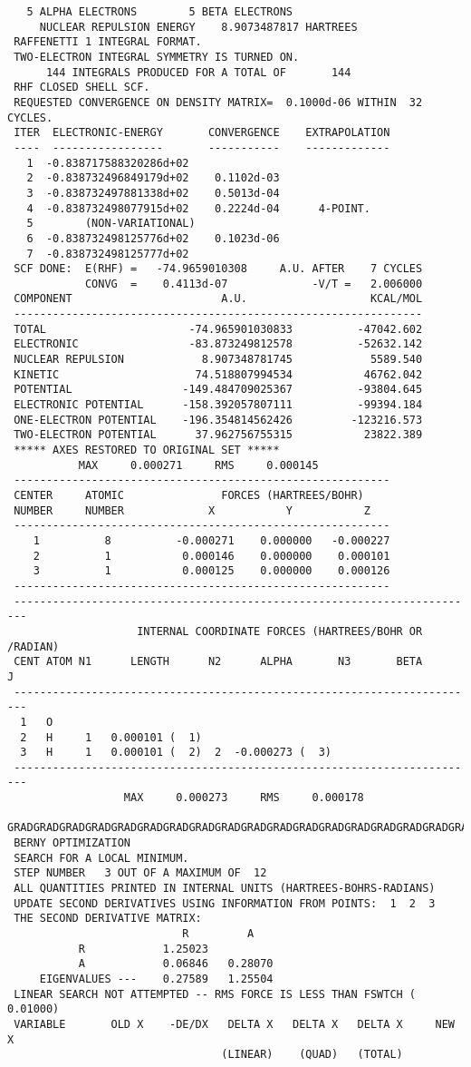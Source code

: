 {\begin{verbatim}
   5 ALPHA ELECTRONS        5 BETA ELECTRONS
     NUCLEAR REPULSION ENERGY    8.9073487817 HARTREES
 RAFFENETTI 1 INTEGRAL FORMAT.
 TWO-ELECTRON INTEGRAL SYMMETRY IS TURNED ON.
      144 INTEGRALS PRODUCED FOR A TOTAL OF       144
 RHF CLOSED SHELL SCF.
 REQUESTED CONVERGENCE ON DENSITY MATRIX=  0.1000d-06 WITHIN  32 CYCLES.
 ITER  ELECTRONIC-ENERGY       CONVERGENCE    EXTRAPOLATION
 ----  -----------------       -----------    -------------
   1  -0.838717588320286d+02
   2  -0.838732496849179d+02    0.1102d-03
   3  -0.838732497881338d+02    0.5013d-04
   4  -0.838732498077915d+02    0.2224d-04      4-POINT.
   5        (NON-VARIATIONAL)
   6  -0.838732498125776d+02    0.1023d-06
   7  -0.838732498125777d+02
 SCF DONE:  E(RHF) =   -74.9659010308     A.U. AFTER    7 CYCLES
            CONVG  =    0.4113d-07             -V/T =   2.006000
 COMPONENT                       A.U.                   KCAL/MOL
 ---------------------------------------------------------------
 TOTAL                      -74.965901030833          -47042.602
 ELECTRONIC                 -83.873249812578          -52632.142
 NUCLEAR REPULSION            8.907348781745            5589.540
 KINETIC                     74.518807994534           46762.042
 POTENTIAL                 -149.484709025367          -93804.645
 ELECTRONIC POTENTIAL      -158.392057807111          -99394.184
 ONE-ELECTRON POTENTIAL    -196.354814562426         -123216.573
 TWO-ELECTRON POTENTIAL      37.962756755315           23822.389
 ***** AXES RESTORED TO ORIGINAL SET *****
           MAX     0.000271     RMS     0.000145
 ----------------------------------------------------------
 CENTER     ATOMIC               FORCES (HARTREES/BOHR)
 NUMBER     NUMBER             X           Y           Z
 ----------------------------------------------------------
    1          8          -0.000271    0.000000   -0.000227
    2          1           0.000146    0.000000    0.000101
    3          1           0.000125    0.000000    0.000126
 ----------------------------------------------------------
 ------------------------------------------------------------------------
                    INTERNAL COORDINATE FORCES (HARTREES/BOHR OR /RADIAN)
 CENT ATOM N1      LENGTH      N2      ALPHA       N3       BETA        J
 ------------------------------------------------------------------------
  1   O 
  2   H     1   0.000101 (  1)
  3   H     1   0.000101 (  2)  2  -0.000273 (  3)
 ------------------------------------------------------------------------
                  MAX     0.000273     RMS     0.000178
 GRADGRADGRADGRADGRADGRADGRADGRADGRADGRADGRADGRADGRADGRADGRADGRADGRADGRAD
 BERNY OPTIMIZATION
 SEARCH FOR A LOCAL MINIMUM.
 STEP NUMBER   3 OUT OF A MAXIMUM OF  12
 ALL QUANTITIES PRINTED IN INTERNAL UNITS (HARTREES-BOHRS-RADIANS)
 UPDATE SECOND DERIVATIVES USING INFORMATION FROM POINTS:  1  2  3
 THE SECOND DERIVATIVE MATRIX:
                           R         A
           R            1.25023
           A            0.06846   0.28070
     EIGENVALUES ---    0.27589   1.25504
 LINEAR SEARCH NOT ATTEMPTED -- RMS FORCE IS LESS THAN FSWTCH ( 0.01000)
 VARIABLE       OLD X    -DE/DX   DELTA X   DELTA X   DELTA X     NEW X
                                 (LINEAR)    (QUAD)   (TOTAL)


\end{verbatim}}
